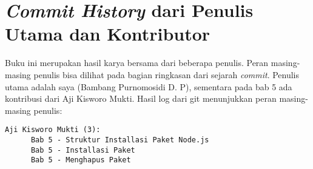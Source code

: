 \chapter{\textit{Commit History} dari Penulis Utama dan Kontributor}

Buku ini merupakan hasil karya bersama dari beberapa penulis. Peran masing-masing penulis bisa dilihat pada bagian ringkasan dari sejarah \textit{commit}. Penulis utama adalah saya (Bambang Purnomosidi D. P), sementara pada bab 5 ada kontribusi dari Aji Kisworo Mukti. Hasil log dari git menunjukkan peran masing-masing penulis:

\begin{lstlisting}
Aji Kisworo Mukti (3):
      Bab 5 - Struktur Installasi Paket Node.js
      Bab 5 - Installasi Paket
      Bab 5 - Menghapus Paket


\end{lstlisting}
